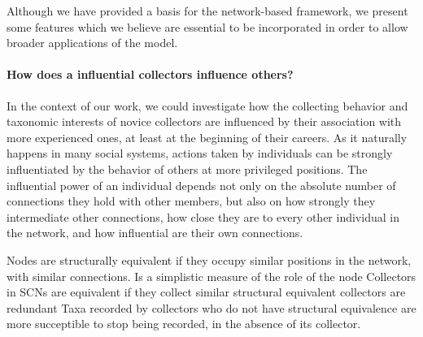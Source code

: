 


Although we have provided a basis for the network-based framework, we present some features which we believe are essential to be incorporated in order to allow broader applications of the model.

\paragraph*{How does a influential collectors influence others?}
In the context of our work, we could investigate how the collecting behavior and taxonomic interests of novice collectors are influenced by their association with more experienced ones, at least at the beginning of their careers.
As it naturally happens in many social systems, actions taken by individuals can be strongly influentiated by the behavior of others at more privileged positions.
The influential power of an individual depends not only on the absolute number of connections they hold with other members, but also on how strongly they intermediate other connections, how close they are to every other individual in the network, and how influential are their own connections.

Nodes are structurally equivalent if they occupy similar positions in the network, with similar connections.
Is a simplistic measure of the role of the node
Collectors in SCNs are equivalent if they collect similar 
structural equivalent collectors are redundant
Taxa recorded by collectors who do not have structural equivalence are more succeptible to stop being recorded, in the absence of its collector.


